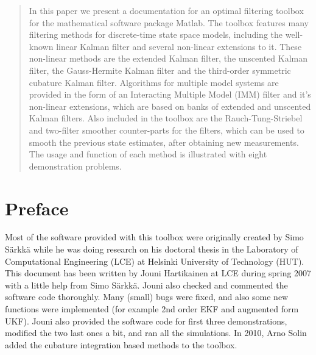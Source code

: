 \documentclass[11pt,a4paper,oneside,english]{report}
\begin{document}
\AddToShipoutPicture*{\BackgroundPic}
\maketitle

\begin{abstract}

  In this paper we present a documentation for an optimal filtering
  toolbox for the mathematical software package Matlab. 
  The toolbox features many filtering methods for discrete-time 
  state space models, including the well-known linear Kalman filter 
  and several non-linear extensions to it. 
  These non-linear methods are the extended Kalman filter, 
  the unscented Kalman filter, the Gauss-Hermite Kalman filter and 
  the third-order symmetric cubature Kalman filter. Algorithms for
  multiple model systems are provided in the form of an Interacting
  Multiple Model (IMM) filter and it's non-linear extensions, which
  are based on banks of extended and unscented Kalman filters. Also
  included in the toolbox are the Rauch-Tung-Striebel and two-filter
  smoother counter-parts for the filters, which can be used to smooth
  the previous state estimates, after obtaining new measurements. The
  usage and function of each method is illustrated with eight
  demonstration problems.

\end{abstract}


\newpage

\tableofcontents

\newpage

\section*{Preface}

Most of the software provided with this toolbox were originally created
by Simo Särkkä while he was doing research on his doctoral thesis
\citep{Sarkka:2006} in the Laboratory of Computational Engineering (LCE)
at Helsinki University of Technology (HUT). This document has been
written by Jouni Hartikainen at LCE during spring 2007 with a little
help from Simo Särkkä. Jouni also checked and commented the software
code thoroughly. Many (small) bugs were fixed, and also some new
functions were implemented (for example 2nd order EKF and augmented
form UKF). Jouni also provided the software code for first three
demonstrations, modified the two last ones a bit, and ran all the
simulations. In 2010, Arno Solin added the cubature integration based 
methods to the toolbox.
\end{document}
